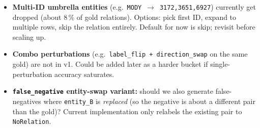 \documentclass[11pt,a4paper]{article}
\newcommand{\code}[1]{\texttt{#1}}
\begin{document}
\begin{itemize}
\item \textbf{Multi-ID umbrella entities} (e.g.\ \code{MODY}~$\to$~\code{3172,3651,6927}) currently get dropped (about 8\,\% of gold relations). Options: pick first ID, expand to multiple rows, skip the relation entirely. Default for now is skip; revisit before scaling up.
\item \textbf{Combo perturbations} (e.g.\ \code{label\_flip + direction\_swap} on the same gold) are not in v1. Could be added later as a harder bucket if single-perturbation accuracy saturates.
\item \textbf{\code{false\_negative} entity-swap variant:} should we also generate false-negatives where \code{entity\_B} is \emph{replaced} (so the negative is about a different pair than the gold)? Current implementation only relabels the existing pair to \code{NoRelation}.
\end{itemize}
\end{document}
